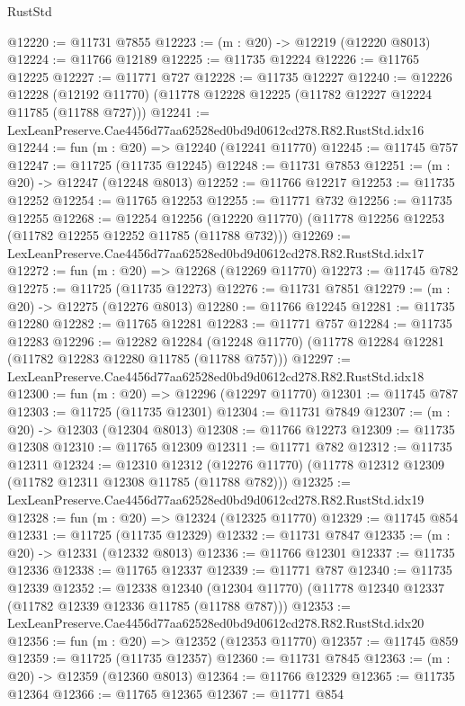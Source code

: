 \begin{lexlean}{RustStd}
\begin{coremodule}
@12220 := @11731 @7855
@12223 := (m : @20) -> @12219 (@12220 @8013)
@12224 := @11766 @12189
@12225 := @11735 @12224
@12226 := @11765 @12225
@12227 := @11771 @727
@12228 := @11735 @12227
@12240 := @12226
    @12228
    (@12192 @11770)
    (@11778 @12228 @12225 (@11782 @12227 @12224 @11785 (@11788 @727)))
@12241 := LexLeanPreserve.Cae4456d77aa62528ed0bd9d0612cd278.R82.RustStd.idx16
@12244 := fun (m : @20) => @12240 (@12241 @11770)
@12245 := @11745 @757
@12247 := @11725 (@11735 @12245)
@12248 := @11731 @7853
@12251 := (m : @20) -> @12247 (@12248 @8013)
@12252 := @11766 @12217
@12253 := @11735 @12252
@12254 := @11765 @12253
@12255 := @11771 @732
@12256 := @11735 @12255
@12268 := @12254
    @12256
    (@12220 @11770)
    (@11778 @12256 @12253 (@11782 @12255 @12252 @11785 (@11788 @732)))
@12269 := LexLeanPreserve.Cae4456d77aa62528ed0bd9d0612cd278.R82.RustStd.idx17
@12272 := fun (m : @20) => @12268 (@12269 @11770)
@12273 := @11745 @782
@12275 := @11725 (@11735 @12273)
@12276 := @11731 @7851
@12279 := (m : @20) -> @12275 (@12276 @8013)
@12280 := @11766 @12245
@12281 := @11735 @12280
@12282 := @11765 @12281
@12283 := @11771 @757
@12284 := @11735 @12283
@12296 := @12282
    @12284
    (@12248 @11770)
    (@11778 @12284 @12281 (@11782 @12283 @12280 @11785 (@11788 @757)))
@12297 := LexLeanPreserve.Cae4456d77aa62528ed0bd9d0612cd278.R82.RustStd.idx18
@12300 := fun (m : @20) => @12296 (@12297 @11770)
@12301 := @11745 @787
@12303 := @11725 (@11735 @12301)
@12304 := @11731 @7849
@12307 := (m : @20) -> @12303 (@12304 @8013)
@12308 := @11766 @12273
@12309 := @11735 @12308
@12310 := @11765 @12309
@12311 := @11771 @782
@12312 := @11735 @12311
@12324 := @12310
    @12312
    (@12276 @11770)
    (@11778 @12312 @12309 (@11782 @12311 @12308 @11785 (@11788 @782)))
@12325 := LexLeanPreserve.Cae4456d77aa62528ed0bd9d0612cd278.R82.RustStd.idx19
@12328 := fun (m : @20) => @12324 (@12325 @11770)
@12329 := @11745 @854
@12331 := @11725 (@11735 @12329)
@12332 := @11731 @7847
@12335 := (m : @20) -> @12331 (@12332 @8013)
@12336 := @11766 @12301
@12337 := @11735 @12336
@12338 := @11765 @12337
@12339 := @11771 @787
@12340 := @11735 @12339
@12352 := @12338
    @12340
    (@12304 @11770)
    (@11778 @12340 @12337 (@11782 @12339 @12336 @11785 (@11788 @787)))
@12353 := LexLeanPreserve.Cae4456d77aa62528ed0bd9d0612cd278.R82.RustStd.idx20
@12356 := fun (m : @20) => @12352 (@12353 @11770)
@12357 := @11745 @859
@12359 := @11725 (@11735 @12357)
@12360 := @11731 @7845
@12363 := (m : @20) -> @12359 (@12360 @8013)
@12364 := @11766 @12329
@12365 := @11735 @12364
@12366 := @11765 @12365
@12367 := @11771 @854

\end{coremodule}
\end{lexlean}

